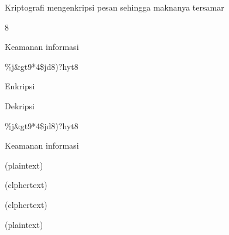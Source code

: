 \documentclass{article}
\begin{document}

Kriptografi mengenkripsi pesan sehingga maknanya tersamar


8

Keamanan informasi

\%j\&gt9*4\$jd8)?hyt8

Enkripsi

Dekripsi

\%j\&gt9*4\$jd8)?hyt8

Keamanan informasi

(plaintext)

(clphertext)

(clphertext)

(plaintext)
\end{document}
